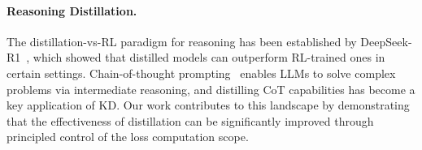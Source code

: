 \paragraph{Reasoning Distillation.}
The distillation-vs-RL paradigm for reasoning has been established by DeepSeek-R1~\citep{deepseekr1}, which showed that distilled models can outperform RL-trained ones in certain settings.
Chain-of-thought prompting~\citep{wei2022chainofthought} enables LLMs to solve complex problems via intermediate reasoning, and distilling CoT capabilities has become a key application of KD.
Our work contributes to this landscape by demonstrating that the effectiveness of distillation can be significantly improved through principled control of the loss computation scope.
